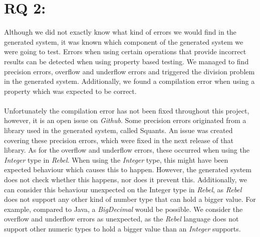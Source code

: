 \section{RQ 2: \rqTwo}
Although we did not exactly know what kind of errors we would find in the generated system, it was
known which component of the generated system we were going to test. Errors when using certain operations that provide incorrect results can be detected when using property based testing. We managed to find precision errors, overflow and underflow errors and triggered the division problem in the generated system. Additionally, we found a compilation error when using a property which was expected to be correct.\\
\\
Unfortunately the compilation error has not been fixed throughout this project, however, it is an open issue on \textit{Github}. Some precision errors originated from a library used in the generated system, called Squants. An issue was created covering these precision errors, which were fixed in the next release of that library. As for the overflow and underflow errors, these occurred when using the \textit{Integer} type in \textit{Rebel}. When using the \textit{Integer} type, this might have been expected behaviour which causes this to happen. However, the generated system does not check whether this happens, nor does it prevent this. Additionally, we can consider this behaviour unexpected on the Integer type in
\textit{Rebel}, as \textit{Rebel} does not support any other kind of number type that can hold a bigger value. For example, compared to
Java, a \textit{BigDecimal} would be possible. We consider the overflow and underflow errors as unexpected, as the \textit{Rebel} language does not support other numeric types to hold a bigger value than an \textit{Integer} supports.

